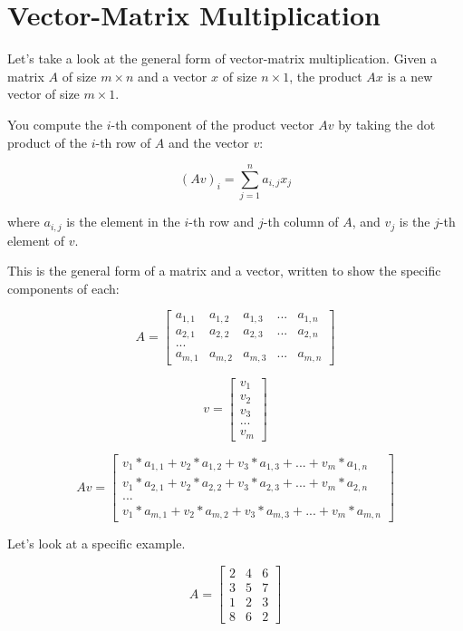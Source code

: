 \section{Vector-Matrix Multiplication}
Let's take a look at the general form of vector-matrix multiplication. Given a matrix $A$ of size $m \times n$ and a vector $x$ of size $n \times 1$, the product $Ax$ is a new vector of size $m \times 1$. 

You compute the $i$-th component of the product vector $Av$ by taking the dot product of the $i$-th row of $A$ and the vector $v$:

\begin{equation*}
(Av)_i = \sum_{j=1}^n a_{i,j}x_j
\end{equation*}

where $a_{i,j}$ is the element in the $i$-th row and $j$-th column of $A$, and $v_j$ is the $j$-th element of $v$.

This is the general form of a matrix and a vector, written to show the specific components of each:


 $$A = \begin{bmatrix}
 a_{1,1} & a_{1,2}  & a_{1,3} & ... & a_{1,n}  \\
 a_{2,1} & a_{2,2}  & a_{2,3} & ... & a_{2,n}  \\
 ... \\
 a_{m,1} & a_{m,2}  & a_{m,3} & ... & a_{m,n}  
\end{bmatrix}$$

$$v = \begin{bmatrix}
 v_{1}  \\
 v_{2} \\
 v_{3} \\
 ... \\
 v_{m} 
\end{bmatrix}$$

 $$Av =\begin{bmatrix}
 v_{1}*a_{1,1} +v_{2}*a_{1,2}  +v_{3}*a_{1,3} +... +v_{m}*a_{1,n}  \\
 v_{1}*a_{2,1} +v_{2}*a_{2,2}  +v_{3}*a_{2,3} +... +v_{m}*a_{2,n}  \\
 ... \\
 v_{1}*a_{m,1} +v_{2}*a_{m,2}  +v_{3}*a_{m,3} +... +v_{m}*a_{m,n}  
\end{bmatrix}$$

Let's look at a specific example.

$$A = \begin{bmatrix}
 2  & 4 & 6  \\
 3  & 5 & 7  \\
 1  & 2 & 3  \\
 8  & 6 & 2 
\end{bmatrix}$$

